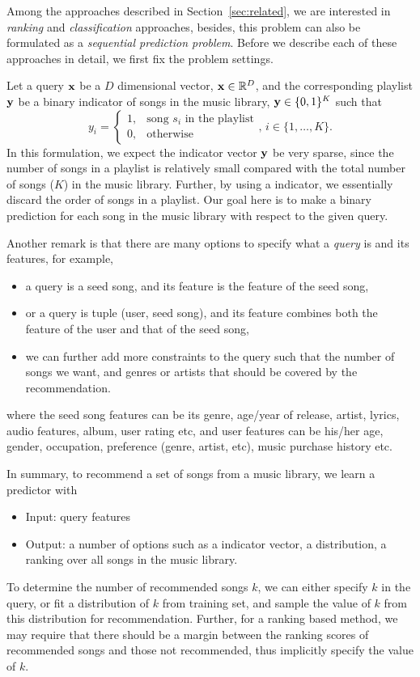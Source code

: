Among the approaches described in Section~\ref{sec:related}, we are interested in \emph{ranking} and \emph{classification} approaches,
besides, this problem can also be formulated as a \emph{sequential prediction problem}. 
Before we describe each of these approaches in detail, we first fix the problem settings.

Let a query $\mathbf{x}$ be a $D$ dimensional vector, \ie $\mathbf{x} \in \mathbb{R}^D$, 
and the corresponding playlist $\mathbf{y}$ be a binary indicator of songs in the music library, \ie $\mathbf{y} \in \{0,1\}^K$ such that 
$$
y_i = 
\begin{cases}
1, & \text{song $s_i$ in the playlist} \\
0, & \text{otherwise}
\end{cases}, \, i \in \{1,\dots,K\}.
$$
In this formulation, we expect the indicator vector $\mathbf{y}$ be very sparse, 
since the number of songs in a playlist is relatively small compared with the total number of songs (\ie $K$) in the music library.
Further, by using a indicator, we essentially discard the order of songs in a playlist.
Our goal here is to make a binary prediction for each song in the music library with respect to the given query.


Another remark is that there are many options to specify what a \emph{query} is and its features, for example,
\begin{itemize}
\item a query is a seed song, and its feature is the feature of the seed song,
\item or a query is tuple (user, seed song), and its feature combines both the feature of the user and that of the seed song,
\item we can further add more constraints to the query such that the number of songs we want, 
      and genres or artists that should be covered by the recommendation.
\end{itemize}
where the seed song features can be its genre, age/year of release, artist, lyrics, audio features, album, user rating etc,
and user features can be his/her age, gender, occupation, preference (genre, artist, etc), music purchase history etc.


In summary, to recommend a set of songs from a music library, we learn a predictor with
\begin{itemize}
\item Input: query features
\item Output: a number of options such as a indicator vector, a distribution, a ranking over all songs in the music library.
\end{itemize}
To determine the number of recommended songs $k$, we can either specify $k$ in the query,
or fit a distribution of $k$ from training set, and sample the value of $k$ from this distribution for recommendation.
Further, for a ranking based method, we may require that there should be a margin between the ranking scores of recommended songs and 
those not recommended, thus implicitly specify the value of $k$.



